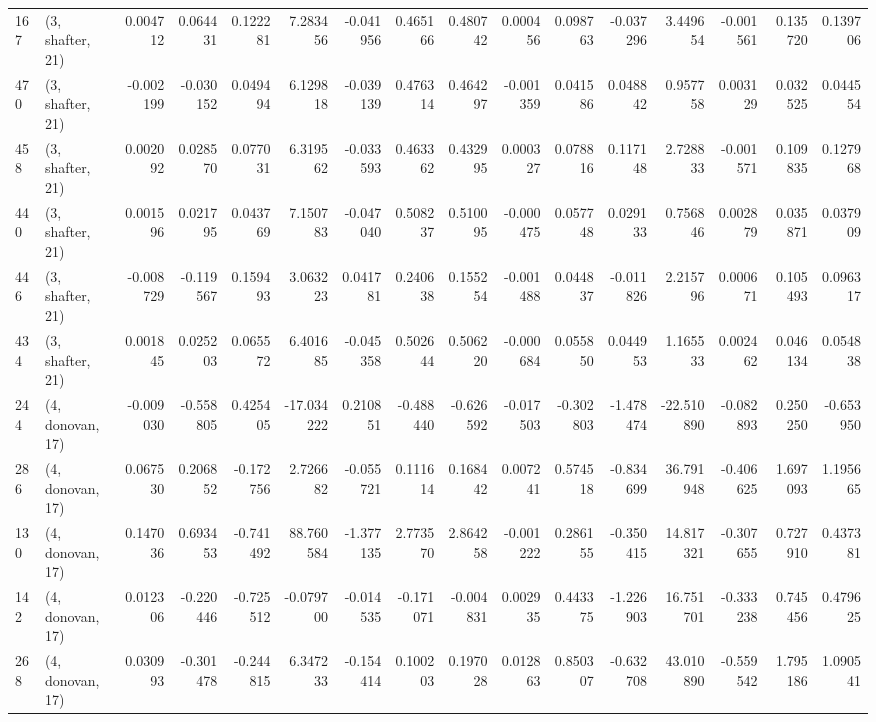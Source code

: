 \begin{tabular}{llrrrrrrrrrrrrrr}
167 &  (3, shafter, 21) &   0.004712 &  0.064431 &  0.122281 &    7.283456 & -0.041956 &   0.465166 &  0.480742 &  0.000456 &  0.098763 & -0.037296 &    3.449654 & -0.001561 &  0.135720 &  0.139706 \\
470 &  (3, shafter, 21) &  -0.002199 & -0.030152 &  0.049494 &    6.129818 & -0.039139 &   0.476314 &  0.464297 & -0.001359 &  0.041586 &  0.048842 &    0.957758 &  0.003129 &  0.032525 &  0.044554 \\
458 &  (3, shafter, 21) &   0.002092 &  0.028570 &  0.077031 &    6.319562 & -0.033593 &   0.463362 &  0.432995 &  0.000327 &  0.078816 &  0.117148 &    2.728833 & -0.001571 &  0.109835 &  0.127968 \\
440 &  (3, shafter, 21) &   0.001596 &  0.021795 &  0.043769 &    7.150783 & -0.047040 &   0.508237 &  0.510095 & -0.000475 &  0.057748 &  0.029133 &    0.756846 &  0.002879 &  0.035871 &  0.037909 \\
446 &  (3, shafter, 21) &  -0.008729 & -0.119567 &  0.159493 &    3.063223 &  0.041781 &   0.240638 &  0.155254 & -0.001488 &  0.044837 & -0.011826 &    2.215796 &  0.000671 &  0.105493 &  0.096317 \\
434 &  (3, shafter, 21) &   0.001845 &  0.025203 &  0.065572 &    6.401685 & -0.045358 &   0.502644 &  0.506220 & -0.000684 &  0.055850 &  0.044953 &    1.165533 &  0.002462 &  0.046134 &  0.054838 \\
244 &  (4, donovan, 17) &  -0.009030 & -0.558805 &  0.425405 &  -17.034222 &  0.210851 &  -0.488440 & -0.626592 & -0.017503 & -0.302803 & -1.478474 &  -22.510890 & -0.082893 &  0.250250 & -0.653950 \\
286 &  (4, donovan, 17) &   0.067530 &  0.206852 & -0.172756 &    2.726682 & -0.055721 &   0.111614 &  0.168442 &  0.007241 &  0.574518 & -0.834699 &   36.791948 & -0.406625 &  1.697093 &  1.195665 \\
130 &  (4, donovan, 17) &   0.147036 &  0.693453 & -0.741492 &   88.760584 & -1.377135 &   2.773570 &  2.864258 & -0.001222 &  0.286155 & -0.350415 &   14.817321 & -0.307655 &  0.727910 &  0.437381 \\
142 &  (4, donovan, 17) &   0.012306 & -0.220446 & -0.725512 &   -0.079700 & -0.014535 &  -0.171071 & -0.004831 &  0.002935 &  0.443375 & -1.226903 &   16.751701 & -0.333238 &  0.745456 &  0.479625 \\
268 &  (4, donovan, 17) &   0.030993 & -0.301478 & -0.244815 &    6.347233 & -0.154414 &   0.100203 &  0.197028 &  0.012863 &  0.850307 & -0.632708 &   43.010890 & -0.559542 &  1.795186 &  1.090541 \\

\end{tabular}
